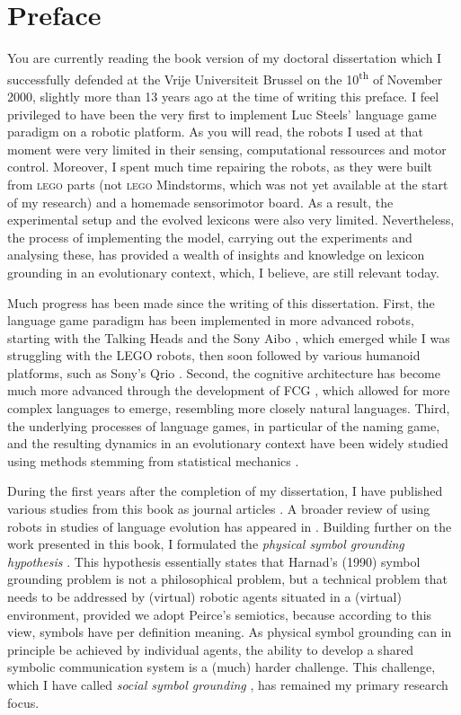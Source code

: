 \chapter*{Preface}

You are currently reading the book version of my doctoral dissertation which I successfully defended at the Vrije Universiteit Brussel on the 10\textsuperscript{th} of November 2000, slightly more than 13 years ago at the time of writing this preface. I feel privileged to have been the very first to implement Luc Steels' language game paradigm on a robotic platform. As you will read, the robots I used at that moment were very limited in their sensing, computational ressources and motor control. Moreover, I spent much time repairing the robots, as they were built from \textsc{lego} parts (not \textsc{lego} Mindstorms, which was not yet available at the start of my research) and a homemade sensorimotor board. As a result, the experimental setup and the evolved lexicons were also very limited. Nevertheless, the process of implementing the model, carrying out the experiments and analysing these, has provided a wealth of insights and knowledge on lexicon grounding in an evolutionary context, which, I believe, are still relevant today.

Much progress has been made since the writing of this dissertation. First, the language game paradigm has been implemented in more advanced robots, starting with the Talking Heads \citep{steelsetal:2002} and the Sony Aibo \citep{steelskaplan:2000}, which emerged while I was struggling with the LEGO robots, then soon followed by various humanoid platforms, such as Sony's Qrio \citep[see, e.g., ][ and this book series]{steels:2012}. Second, the cognitive architecture has become much more advanced through the development of FCG \citep{steelsdebeule:2006}, which allowed for more complex languages to emerge, resembling more closely natural languages. Third, the underlying processes of language games, in particular of the naming game, and the resulting dynamics in an evolutionary context have been widely studied using methods stemming from statistical mechanics \citep[e.g., ][]{baronchellietal:2006a}.

During the first years after the completion of my dissertation, I have published various studies from this book as journal articles \citep{vogt:2000c,vogt:2002a,vogt:2003a}. A broader review of using robots in studies of language evolution has appeared in \citet{vogt:2006a}. Building further on the work presented in this book, I formulated the {\em physical symbol grounding hypothesis} \citep{vogt:2002a}. This hypothesis essentially states that Harnad's (1990) symbol grounding problem is not a philosophical problem, but a technical problem that needs to be addressed by (virtual) robotic agents situated in a (virtual) environment, provided we adopt Peirce's semiotics, because according to this view, symbols have per definition meaning. As physical symbol grounding can in principle be achieved by individual agents, the ability to develop a shared symbolic communication system is a (much) harder challenge. This challenge, which I have called {\em social symbol grounding} \citep{vogtdivina:2007}, has remained my primary research focus.

